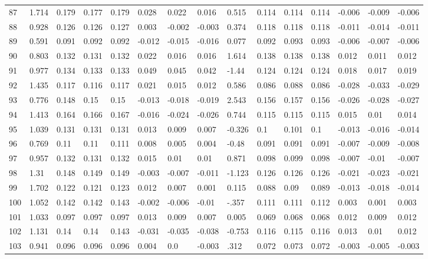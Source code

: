 \begin{table}
\begin{tabular}{|l|l|lll|lll|l|lll|lll}
		87 & 1.714 & 0.179 & 0.177 & 0.179 & 0.028 & 0.022 & 0.016 & 0.515 & 0.114 & 0.114 & 0.114 & -0.006 & -0.009 & -0.006 \\
		88 & 0.928 & 0.126 & 0.126 & 0.127 & 0.003 & -0.002 & -0.003 & 0.374 & 0.118 & 0.118 & 0.118 & -0.011 & -0.014 & -0.011 \\
		89 & 0.591 & 0.091 & 0.092 & 0.092 & -0.012 & -0.015 & -0.016 & 0.077 & 0.092 & 0.093 & 0.093 & -0.006 & -0.007 & -0.006 \\
		90 & 0.803 & 0.132 & 0.131 & 0.132 & 0.022 & 0.016 & 0.016 & 1.614 & 0.138 & 0.138 & 0.138 & 0.012 & 0.011 & 0.012 \\
		91 & 0.977 & 0.134 & 0.133 & 0.133 & 0.049 & 0.045 & 0.042 & -1.44 & 0.124 & 0.124 & 0.124 & 0.018 & 0.017 & 0.019 \\
		92 & 1.435 & 0.117 & 0.116 & 0.117 & 0.021 & 0.015 & 0.012 & 0.586 & 0.086 & 0.088 & 0.086 & -0.028 & -0.033 & -0.029 \\
		93 & 0.776 & 0.148 & 0.15 & 0.15 & -0.013 & -0.018 & -0.019 & 2.543 & 0.156 & 0.157 & 0.156 & -0.026 & -0.028 & -0.027 \\
		94 & 1.413 & 0.164 & 0.166 & 0.167 & -0.016 & -0.024 & -0.026 & 0.744 & 0.115 & 0.115 & 0.115 & 0.015 & 0.01 & 0.014 \\
		95 & 1.039 & 0.131 & 0.131 & 0.131 & 0.013 & 0.009 & 0.007 & -0.326 & 0.1 & 0.101 & 0.1 & -0.013 & -0.016 & -0.014 \\
		96 & 0.769 & 0.11 & 0.11 & 0.111 & 0.008 & 0.005 & 0.004 & -0.48 & 0.091 & 0.091 & 0.091 & -0.007 & -0.009 & -0.008 \\
		97 & 0.957 & 0.132 & 0.131 & 0.132 & 0.015 & 0.01 & 0.01 & 0.871 & 0.098 & 0.099 & 0.098 & -0.007 & -0.01 & -0.007 \\
		98 & 1.31 & 0.148 & 0.149 & 0.149 & -0.003 & -0.007 & -0.011 & -1.123 & 0.126 & 0.126 & 0.126 & -0.021 & -0.023 & -0.021 \\
		99 & 1.702 & 0.122 & 0.121 & 0.123 & 0.012 & 0.007 & 0.001 & 0.115 & 0.088 & 0.09 & 0.089 & -0.013 & -0.018 & -0.014 \\
		100 & 1.052 & 0.142 & 0.142 & 0.143 & -0.002 & -0.006 & -0.01 & -.357 & 0.111 & 0.111 & 0.112 & 0.003 & 0.001 & 0.003 \\
		101 & 1.033 & 0.097 & 0.097 & 0.097 & 0.013 & 0.009 & 0.007 & 0.005 & 0.069 & 0.068 & 0.068 & 0.012 & 0.009 & 0.012 \\
		102 & 1.131 & 0.14 & 0.14 & 0.143 & -0.031 & -0.035 & -0.038 & -0.753 & 0.116 & 0.115 & 0.116 & 0.013 & 0.01 & 0.012 \\
		103 & 0.941 & 0.096 & 0.096 & 0.096 & 0.004 & 0.0 & -0.003 & .312 & 0.072 & 0.073 & 0.072 & -0.003 & -0.005 & -0.003 \\

\end{tabular}
\end{table}
